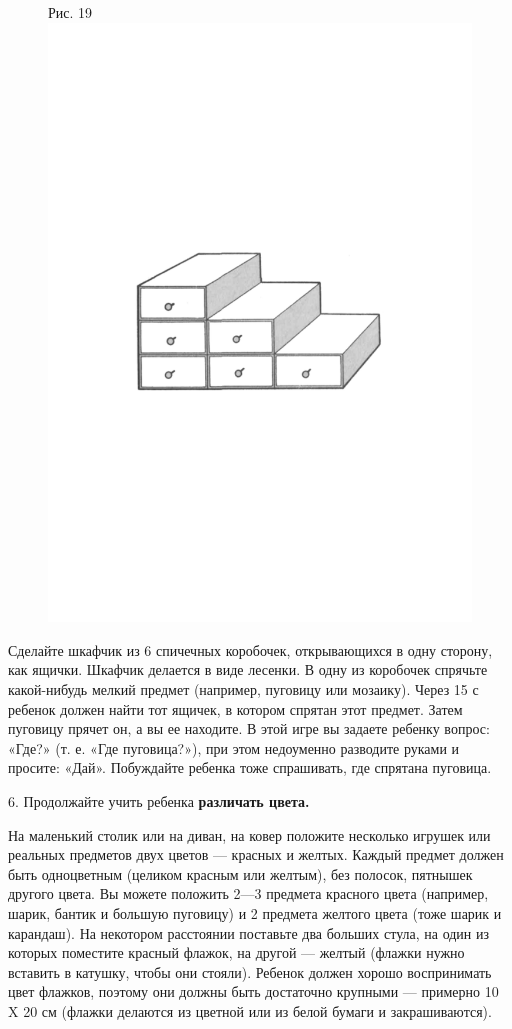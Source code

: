 \documentclass[a5paper]{book}
\begin{document}
\begin{figure}
\centering
Рис. 19 \includegraphics[width=\linewidth]{media/media/image16.png}
\end{figure}

Сделайте шкафчик из 6 спичечных коробочек, открывающихся в одну сторону,
как ящички. Шкафчик делается в виде лесенки. В одну из коробочек
спрячьте какой-нибудь мелкий предмет (например, пуговицу или мозаику).
Через 15 с ребенок должен найти тот ящичек, в котором спрятан этот
предмет. Затем пуговицу прячет он, а вы ее находите. В этой игре вы
задаете ребенку вопрос: «Где?» (т. е. «Где пуговица?»), при этом
недоуменно разводите руками и просите: «Дай». Побуждайте ребенка тоже
спрашивать, где спрятана пуговица.

6. Продолжайте учить ребенка \textbf{различать цвета.}

На маленький столик или на диван, на ковер положите несколько игрушек
или реальных предметов двух цветов --- красных и желтых. Каждый предмет
должен быть одноцветным (целиком красным или желтым), без полосок,
пятнышек другого цвета. Вы можете положить 2---3 предмета красного цвета
(например, шарик, бантик и большую пуговицу) и 2 предмета желтого цвета
(тоже шарик и карандаш). На некотором расстоянии поставьте два больших
стула, на один из которых поместите красный флажок, на другой --- желтый
(флажки нужно вставить в катушку, чтобы они стояли). Ребенок должен
хорошо воспринимать цвет флажков, поэтому они должны быть достаточно
крупными --- примерно 10 X 20 см (флажки делаются из цветной или из
белой бумаги и закрашиваются).
\end{document}
